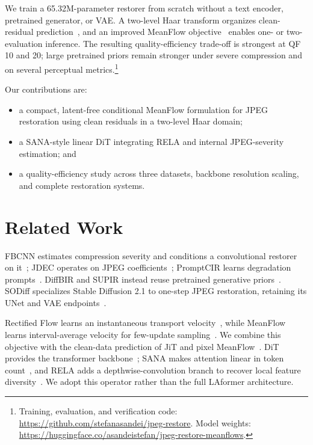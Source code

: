 \documentclass[conference,letterpaper]{IEEEtran}
\begin{document}
We train a 65.32M-parameter restorer from scratch without a text encoder, pretrained generator, or VAE. A two-level Haar transform organizes clean-residual prediction~\cite{li2025jit,lu2026pixelmeanflow}, and an improved MeanFlow objective~\cite{geng2025meanflow,geng2025improved} enables one- or two-evaluation inference. The resulting quality-efficiency trade-off is strongest at QF 10 and 20; large pretrained priors remain stronger under severe compression and on several perceptual metrics.\footnote{Training, evaluation, and verification code: \url{https://github.com/stefanasandei/jpeg-restore}. Model weights: \url{https://huggingface.co/asandeistefan/jpeg-restore-meanflows}.}

Our contributions are:
\begin{itemize}
\item a compact, latent-free conditional MeanFlow formulation for JPEG restoration using clean residuals in a two-level Haar domain;
\item a SANA-style linear DiT integrating RELA and internal JPEG-severity estimation; and
\item a quality-efficiency study across three datasets, backbone resolution scaling, and complete restoration systems.
\end{itemize}

\section{Related Work}

FBCNN estimates compression severity and conditions a convolutional restorer on it~\cite{jiang2021fbcnn}; JDEC operates on JPEG coefficients~\cite{han2024jdec}; PromptCIR learns degradation prompts~\cite{li2024promptcir}. DiffBIR and SUPIR instead reuse pretrained generative priors~\cite{lin2024diffbir,yu2024supir}. SODiff specializes Stable Diffusion 2.1 to one-step JPEG restoration, retaining its UNet and VAE endpoints~\cite{yang2025sodiff,stable_diffusion_21}.

Rectified Flow learns an instantaneous transport velocity~\cite{liu2023rectifiedflow}, while MeanFlow learns interval-average velocity for few-update sampling~\cite{geng2025meanflow,geng2025improved}. We combine this objective with the clean-data prediction of JiT and pixel MeanFlow~\cite{li2025jit,lu2026pixelmeanflow}. DiT provides the transformer backbone~\cite{peebles2023dit}; SANA makes attention linear in token count~\cite{xie2024sana}, and RELA adds a depthwise-convolution branch to recover local feature diversity~\cite{ai2025rela}. We adopt this operator rather than the full LAformer architecture.
\end{document}
